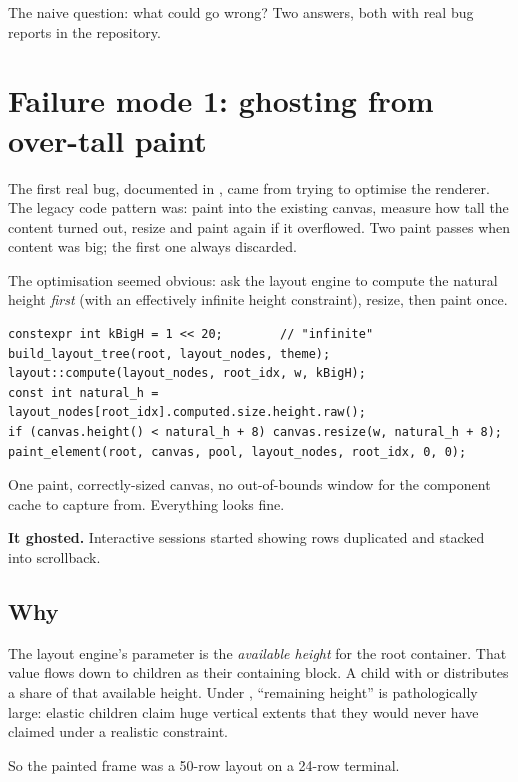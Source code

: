 The naive question: what could go wrong? Two answers, both with
real bug reports in the repository.

\section{Failure mode 1: ghosting from over-tall paint}

The first real bug, documented in
, came from trying to
optimise the renderer. The legacy code pattern was: paint into the
existing canvas, measure how tall the content turned out, resize and
paint again if it overflowed. Two paint passes when content was big;
the first one always discarded.

The optimisation seemed obvious: ask the layout engine to compute
the natural height \emph{first} (with an effectively infinite height
constraint), resize, then paint once.

\begin{lstlisting}
constexpr int kBigH = 1 << 20;        // "infinite"
build_layout_tree(root, layout_nodes, theme);
layout::compute(layout_nodes, root_idx, w, kBigH);
const int natural_h = layout_nodes[root_idx].computed.size.height.raw();
if (canvas.height() < natural_h + 8) canvas.resize(w, natural_h + 8);
paint_element(root, canvas, pool, layout_nodes, root_idx, 0, 0);
\end{lstlisting}

One paint, correctly-sized canvas, no out-of-bounds window for the
component cache to capture from. Everything looks fine.

\textbf{It ghosted.} Interactive sessions started showing rows
duplicated and stacked into scrollback.

\subsection{Why}

The layout engine's  parameter is the \emph{available
height} for the root container. That value flows down to children
as their containing block. A child with  or
 distributes a share of that available
height. Under , ``remaining height'' is pathologically
large: elastic children claim huge vertical extents that they would
never have claimed under a realistic constraint.

So the painted frame was a 50-row layout on a 24-row terminal.

